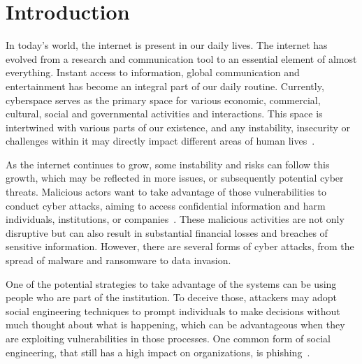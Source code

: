 \chapter{Introduction}
\label{chapter:introduction}







In today's world, the internet is present in our daily lives. The internet has evolved from a research and communication tool to an essential element of almost everything. Instant access to information, global communication and entertainment has become an integral part of our daily routine. Currently, cyberspace serves as the primary space for various economic, commercial, cultural, social and governmental activities and interactions. This space is intertwined with various parts of our existence, and any instability, insecurity or challenges within it may directly impact different areas of human lives~\cite{li2021comprehensive}. 

As the internet continues to grow, some instability and risks can follow this growth, which may be reflected in more issues, or subsequently potential cyber threats. Malicious actors want to take advantage of those vulnerabilities to conduct cyber attacks, aiming to access confidential information and harm individuals, institutions, or companies~\cite{bendovschi2015cyber}. These malicious activities are not only disruptive but can also result in substantial financial losses and breaches of sensitive information. However, there are several forms of cyber attacks, from the spread of malware and ransomware to data invasion.

One of the potential strategies to take advantage of the systems can be using people who are part of the institution. To deceive those, attackers may adopt social engineering techniques to prompt individuals to make decisions without much thought about what is happening, which can be advantageous when they are exploiting vulnerabilities in those processes. One common form of social engineering, that still has a high impact on organizations, is phishing~\cite{cisa2023cyberattacks}.

